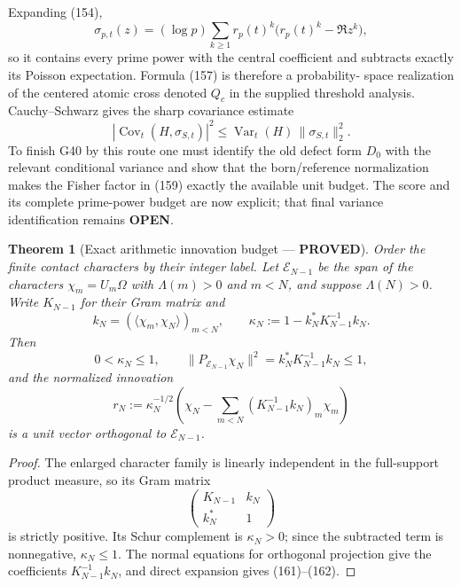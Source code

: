 \documentclass[11pt]{article}
\newtheorem{theorem}{Theorem}
\newcommand{\PROVED}{\textcolor{green!45!black}{\textbf{PROVED}}}
\newcommand{\OPEN}{\textcolor{red!70!black}{\textbf{OPEN}}}
\begin{document}
Expanding (154),
\begin{equation}
 \sigma_{p,t}(z)
 =(\log p)\sum_{k\ge1}r_p(t)^k
       \bigl(r_p(t)^k-\Re z^k\bigr),                  \tag{158}
\end{equation}
so it contains every prime power with the central coefficient and subtracts
exactly its Poisson expectation.  Formula (157) is therefore a probability-
space realization of the centered atomic cross denoted $Q_c$ in the supplied
threshold analysis.  Cauchy--Schwarz gives the sharp covariance estimate
\begin{equation}
 |\operatorname{Cov}_t(H,\sigma_{S,t})|^2
 \le\operatorname{Var}_t(H)\,
      \|\sigma_{S,t}\|_2^2.                           \tag{159}
\end{equation}
To finish G40 by this route one must identify the old defect form $D_0$ with
the relevant conditional variance and show that the born/reference
normalization makes the Fisher factor in (159) exactly the available unit
budget.  The score and its complete prime-power budget are now explicit;
that final variance identification remains \OPEN{}.

\begin{theorem}[Exact arithmetic innovation budget --- \PROVED]
Order the finite contact characters by their integer label.  Let
$\mathscr E_{N-1}$ be the span of the characters $\chi_m=U_m\Omega$ with
$\Lambda(m)>0$ and $m<N$, and suppose $\Lambda(N)>0$.  Write $K_{N-1}$ for
their Gram matrix and
\begin{equation}
 k_N=(\langle\chi_m,\chi_N\rangle)_{m<N},
 \qquad
 \kappa_N:=1-k_N^*K_{N-1}^{-1}k_N.                    \tag{160}
\end{equation}
Then
\begin{equation}
 0<\kappa_N\le1,
 \qquad
 \|P_{\mathscr E_{N-1}}\chi_N\|^2
 =k_N^*K_{N-1}^{-1}k_N\le1,                           \tag{161}
\end{equation}
and the normalized innovation
\begin{equation}
 r_N:=\kappa_N^{-1/2}
 \left(\chi_N-\sum_{m<N}(K_{N-1}^{-1}k_N)_m\chi_m\right) \tag{162}
\end{equation}
is a unit vector orthogonal to $\mathscr E_{N-1}$.
\end{theorem}

\begin{proof}
The enlarged character family is linearly independent in the full-support
product measure, so its Gram matrix
\[
 \begin{pmatrix}K_{N-1}&k_N\\k_N^*&1\end{pmatrix}
\]
is strictly positive.  Its Schur complement is $\kappa_N>0$; since the
subtracted term is nonnegative, $\kappa_N\le1$.  The normal equations for
orthogonal projection give the coefficients $K_{N-1}^{-1}k_N$, and direct
expansion gives (161)--(162).
\end{proof}
\end{document}
